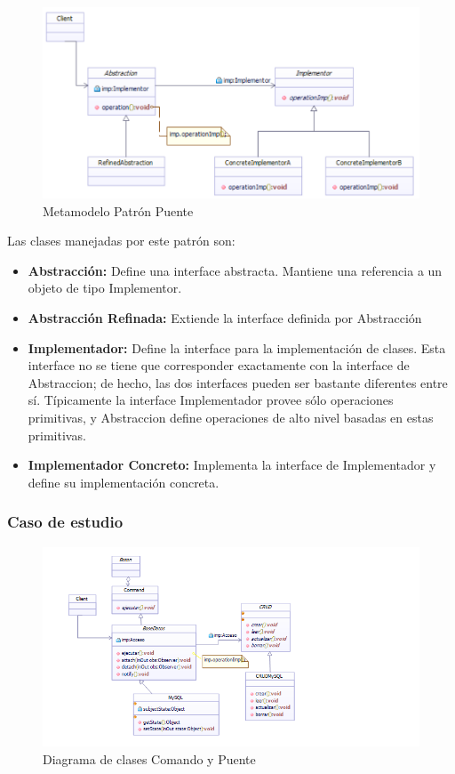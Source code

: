 \begin{figure}[th!]
	\centering
	\includegraphics[width=1.0\linewidth]{arquitectura/imagenes/modeloPuente}
	\caption{Metamodelo Patrón Puente}
	\label{fig:metamodelo puente}
\end{figure}

Las clases manejadas por este patrón son:
\begin{itemize}
	\item \textbf{Abstracción: }Define una interface abstracta. Mantiene una referencia a un objeto de tipo Implementor.
	\item \textbf{Abstracción Refinada: }Extiende la interface definida por Abstracción 
	\item \textbf{Implementador: }Define la interface para la implementación de clases. Esta interface no se tiene que corresponder exactamente con la interface de Abstraccion; de hecho, las dos interfaces pueden ser bastante diferentes entre sí. Típicamente la interface Implementador provee sólo operaciones primitivas, y Abstraccion define operaciones de alto nivel basadas en estas primitivas.
	\item \textbf{Implementador Concreto: }Implementa la interface de Implementador y define su implementación concreta.
\end{itemize}



\subsubsection{Caso de estudio}


\begin{figure}[th!]
	\centering
	\includegraphics[width=1.0\linewidth]{arquitectura/imagenes/DiagramaComandoYPuente}
	\caption{Diagrama de clases  Comando y Puente}
\end{figure}




